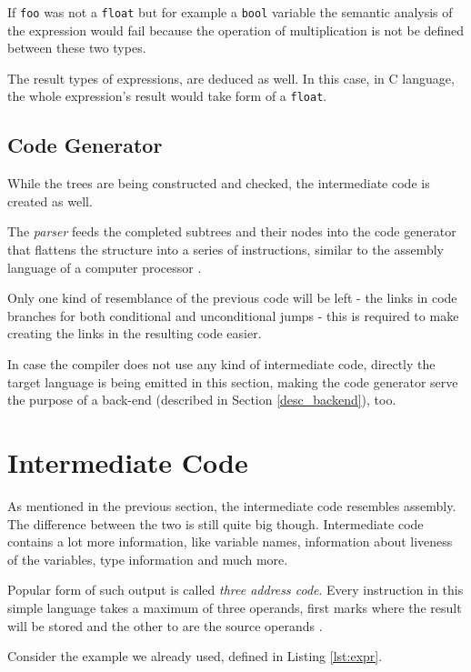             If \texttt{foo} was not a \texttt{float} but for example a \texttt{bool} variable the semantic analysis of the expression would fail because the operation of multiplication is not be defined between these two types.

            The result types of expressions, are deduced as well. In this case, in C language, the whole expression's result would take form of a \texttt{float}.

        \subsection{Code Generator}

            While the trees are being constructed and checked, the intermediate code is created as well.

            The \emph{parser} feeds the completed subtrees and their nodes into the code generator that flattens the structure into a series of instructions, similar to the assembly language of a computer processor \cite{DragonBook}.

            Only one kind of resemblance of the previous code will be left - the links in code branches for both conditional and unconditional jumps - this is required to make creating the links in the resulting code easier.

            In case the compiler does not use any kind of intermediate code, directly the target language is being emitted in this section, making the code generator serve the purpose of a back-end (described in Section \ref{desc_backend}), too.

    \section{Intermediate Code}\label{immediate}

            As mentioned in the previous section, the intermediate code resembles assembly. The difference between the two is still quite big though. Intermediate code contains a lot more information, like variable names, information about liveness of the variables, type information and much more.

            Popular form of such output is called \emph{three address code}. Every instruction in this simple language takes a maximum of three operands, first marks where the result will be stored and the other to are the source operands \cite{DragonBook}.

            Consider the example we already used, defined in Listing \ref{lst:expr}.

